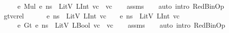 \begin{isabellebody}
\ \ \ {\isachardoublequoteopen}{\isasymLambda}{\isacharcomma}{\kern0pt}{\isasymGamma}{\isacharcomma}{\kern0pt}{\isasymOmega}\ {\isasymturnstile}\ {\isasymlangle}e{}\ {\isasymguillemotleft}Mul{\isasymguillemotright}\ e{}{\isacharcomma}{\kern0pt}\ ns{\isasymrangle}\ {\isasymDown}\ LitV\ {\isacharparenleft}{\kern0pt}LInt\ {\isacharparenleft}{\kern0pt}vc{}\ {\isacharasterisk}{\kern0pt}\ vc{}{\isacharparenright}{\kern0pt}{\isacharparenright}{\kern0pt}{\isachardoublequoteclose}\isanewline
%
\isadelimproof
\ \ %
\endisadelimproof
%
\isatagproof
{}\isamarkupfalse%
\ assms\isanewline
\ \ \isamarkupfalse%
\ {\isacharparenleft}{\kern0pt}auto\ intro{\isacharcolon}{\kern0pt}\ RedBinOp{\isacharparenright}{\kern0pt}%
\endisatagproof
{\isafoldproof}%
%
\isadelimproof
\isanewline
%
\endisadelimproof
\isanewline
{}\isamarkupfalse%
\ gt{\isacharunderscore}{\kern0pt}vc{\isacharunderscore}{\kern0pt}rel{\isacharcolon}{\kern0pt}\ \isanewline
\ \ \ {\isachardoublequoteopen}{\isasymLambda}{\isacharcomma}{\kern0pt}{\isasymGamma}{\isacharcomma}{\kern0pt}{\isasymOmega}\ {\isasymturnstile}\ {\isasymlangle}e{}{\isacharcomma}{\kern0pt}\ ns{\isasymrangle}\ {\isasymDown}\ LitV\ {\isacharparenleft}{\kern0pt}LInt\ vc{}{\isacharparenright}{\kern0pt}{\isachardoublequoteclose}\ \ {\isachardoublequoteopen}{\isasymLambda}{\isacharcomma}{\kern0pt}{\isasymGamma}{\isacharcomma}{\kern0pt}{\isasymOmega}\ {\isasymturnstile}\ {\isasymlangle}e{}{\isacharcomma}{\kern0pt}\ ns{\isasymrangle}\ {\isasymDown}\ LitV\ {\isacharparenleft}{\kern0pt}LInt\ vc{}{\isacharparenright}{\kern0pt}{\isachardoublequoteclose}\isanewline
\ \ \ {\isachardoublequoteopen}{\isasymLambda}{\isacharcomma}{\kern0pt}{\isasymGamma}{\isacharcomma}{\kern0pt}{\isasymOmega}\ {\isasymturnstile}\ {\isasymlangle}e{}\ {\isasymguillemotleft}Gt{\isasymguillemotright}\ e{}{\isacharcomma}{\kern0pt}\ ns{\isasymrangle}\ {\isasymDown}\ LitV\ {\isacharparenleft}{\kern0pt}LBool\ {\isacharparenleft}{\kern0pt}vc{}\ {\isachargreater}{\kern0pt}\ vc{}{\isacharparenright}{\kern0pt}{\isacharparenright}{\kern0pt}{\isachardoublequoteclose}\isanewline
%
\isadelimproof
\ \ %
\endisadelimproof
%
\isatagproof
{}\isamarkupfalse%
\ assms\isanewline
\ \ \isamarkupfalse%
\ {\isacharparenleft}{\kern0pt}auto\ intro{\isacharcolon}{\kern0pt}\ RedBinOp{\isacharparenright}{\kern0pt}%

\end{isabellebody}
